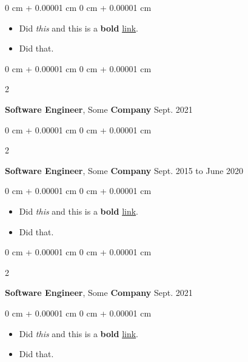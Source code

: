 \documentclass[10pt, letterpaper]{article}
\newenvironment{highlights}{
    \begin{itemize}[
        topsep=0.10 cm,
        parsep=0.10 cm,
        partopsep=0pt,
        itemsep=0pt,
        leftmargin=0 cm + 10pt
    ]
}{
    \end{itemize}
        
    \vspace{-0.10cm}
} %
\newenvironment{onecolentry}{
    \begin{adjustwidth}{
        0 cm + 0.00001 cm
    }{
        0 cm + 0.00001 cm
    }
}{
    \end{adjustwidth}
} %
\newenvironment{twocolentry}[2][]{
    \onecolentry
    \def\secondColumn{#2}
    \setcolumnwidth{\fill, 4.1 cm}
    \begin{paracol}{2}
}{
    \switchcolumn \raggedleft \secondColumn
    \end{paracol}
    \endonecolentry
} %
\begin{document}
        \vspace{0.10 cm}
        \begin{onecolentry}
            \begin{highlights}
                \item Did \textit{this} and this is a \textbf{bold} \href{https://example.com}{link}.
                \item Did that.
            \end{highlights}
        \end{onecolentry}


        \vspace{0.15 cm}

        \begin{twocolentry}{
            Sept. 2021
        }
            \textbf{Software Engineer}, Some \textbf{Company}\end{twocolentry}

        \vspace{0.10 cm}


        \vspace{0.15 cm}

        \begin{twocolentry}{
            Sept. 2015 to June 2020
        }
            \textbf{Software Engineer}, Some \textbf{Company}\end{twocolentry}

        \vspace{0.10 cm}
        \begin{onecolentry}
            \begin{highlights}
                \item Did \textit{this} and this is a \textbf{bold} \href{https://example.com}{link}.
                \item Did that.
            \end{highlights}
        \end{onecolentry}


        \vspace{0.15 cm}

        \begin{twocolentry}{
            Sept. 2021
        }
            \textbf{Software Engineer}, Some \textbf{Company}\end{twocolentry}

        \vspace{0.10 cm}
        \begin{onecolentry}
            \begin{highlights}
                \item Did \textit{this} and this is a \textbf{bold} \href{https://example.com}{link}.
                \item Did that.
            \end{highlights}
        \end{onecolentry}
\end{document}
